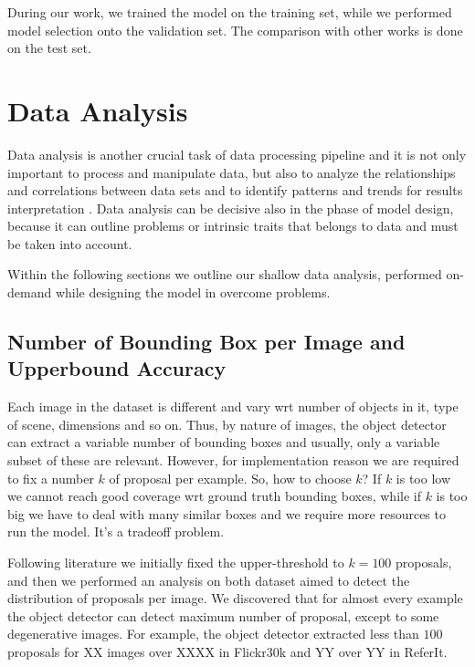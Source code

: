 During our work, we trained the model on the training set, while we
performed model selection onto the validation set. The comparison with
other works is done on the test set. 

\section{Data Analysis}
\label{sec:data-analysis}

Data analysis is another crucial task of data processing pipeline and
it is not only important to process and manipulate data, but also to
analyze the relationships and correlations between data sets and to
identify patterns and trends for results interpretation
\cite{sharma2020understanding}. Data analysis can be decisive also in
the phase of model design, because it can outline problems or
intrinsic traits that belongs to data and must be taken into account.

Within the following sections we outline our shallow data analysis,
performed on-demand while designing the model in overcome problems.

\subsection{Number of Bounding Box per Image and Upperbound Accuracy}
\label{subsec:num-of-proposals}

Each image in the dataset is different and vary wrt number of objects
in it, type of scene, dimensions and so on. Thus, by nature of images,
the object detector can extract a variable number of bounding boxes
and usually, only a variable subset of these are relevant. However,
for implementation reason we are required to fix a number $k$ of
proposal per example. So, how to choose $k$? If $k$ is too low we
cannot reach good coverage wrt ground truth bounding boxes, while if
$k$ is too big we have to deal with many similar boxes and we require
more resources to run the model. It's a tradeoff problem.

Following literature we initially fixed the upper-threshold to $k =
100$ proposals, and then we performed an analysis on both dataset
aimed to detect the distribution of proposals per image. We discovered
that for almost every example the object detector can detect maximum
number of proposal, except to some degenerative images. For example,
the object detector extracted less than $100$ proposals for XX images
over XXXX in Flickr30k and YY over YY in ReferIt.

